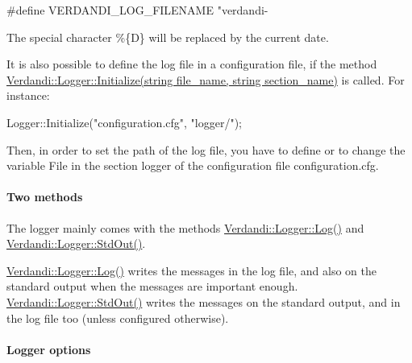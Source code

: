 \documentclass{tufte-book}
\begin{document}
 \begin{frame_cpp}
#define VERDANDI_LOG_FILENAME "verdandi-%
\end{frame_cpp}


\-The special character {\ttfamily \%\{\-D\}} will be replaced by the current date.

\-It is also possible to define the log file in a configuration file, if the method \hyperlink{class_verdandi_1_1_logger_a52a592e84c95a69e8bd0d7d882ff0f2f}{\-Verdandi\-::\-Logger\-::\-Initialize(string file\-\_\-name, string section\-\_\-name)} is called. \-For instance\-:

 \begin{frame_cpp}
Logger::Initialize("configuration.cfg", "logger/");
\end{frame_cpp}


\-Then, in order to set the path of the log file, you have to define or to change the variable {\ttfamily \-File} in the section {\ttfamily logger} of the configuration file {\ttfamily configuration.\-cfg}.

\hypertarget{debugging_logger_methods}{}\paragraph{\-Two methods}\label{debugging_logger_methods}


\-The logger mainly comes with the methods {\ttfamily  \hyperlink{class_verdandi_1_1_logger_ab49f0d118882a7e67bb2e58239b5fafd}{\-Verdandi\-::\-Logger\-::\-Log()}} and {\ttfamily  \hyperlink{class_verdandi_1_1_logger_ad8110c7a55f37213bffae10a39f65035}{\-Verdandi\-::\-Logger\-::\-Std\-Out()}}.

{\ttfamily  \hyperlink{class_verdandi_1_1_logger_ab49f0d118882a7e67bb2e58239b5fafd}{\-Verdandi\-::\-Logger\-::\-Log()}} writes the messages in the log file, and also on the standard output when the messages are important enough. {\ttfamily  \hyperlink{class_verdandi_1_1_logger_ad8110c7a55f37213bffae10a39f65035}{\-Verdandi\-::\-Logger\-::\-Std\-Out()}} writes the messages on the standard output, and in the log file too (unless configured otherwise).

\hypertarget{debugging_logger_options}{}\paragraph{\-Logger options}\label{debugging_logger_options}
\end{document}
